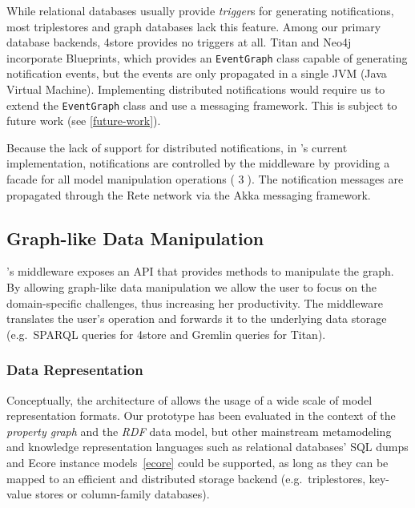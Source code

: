 While relational databases usually provide \emph{trigger}s for generating notifications, most triplestores and graph databases lack this feature. Among our primary database backends, 4store provides no triggers at all. Titan and Neo4j incorporate Blueprints, which provides an \texttt{EventGraph} class capable of generating notification events, but the events are only propagated in a single JVM (Java Virtual Machine). Implementing distributed notifications would require us to extend the \texttt{EventGraph} class and use a messaging framework. This is subject to future work (see \autoref{future-work}). 

Because the lack of support for distributed notifications, in \iqd{}'s current implementation, notifications are controlled by the middleware by providing a facade for all model manipulation operations ( \textcircled{3}). The notification messages are propagated through the Rete network via the Akka messaging framework. 


\subsection{Graph-like Data Manipulation}

\iqd{}'s middleware exposes an API that provides methods to manipulate the graph. By allowing graph-like data manipulation we allow the user to focus on the domain-specific challenges, thus increasing her productivity. The middleware translates the user's operation and forwards it to the underlying data storage (e.g.\ SPARQL queries for 4store and Gremlin queries for Titan).

\subsubsection{Data Representation}

Conceptually, the architecture of \iqd{} allows the usage of a wide scale of model representation formats. Our prototype has been evaluated in the context of the \emph{property graph} and the \emph{RDF} data model, but other mainstream metamodeling and knowledge representation languages such as relational databases' SQL dumps and Ecore instance models~\autoref{ecore} could be supported, as long as they can be mapped to an efficient and distributed storage backend (e.g.\ triplestores, key-value stores or column-family databases).

